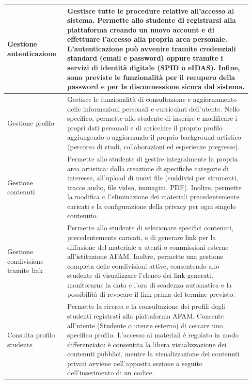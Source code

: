 \documentclass[12pt,a4paper]{article}
\begin{document}
\small
\begin{longtable}{|
>{\columncolor{unipablue}\color{white}\bfseries\raggedright\arraybackslash}p{4.1cm}|
>{\raggedright\arraybackslash}p{10.4cm}|}
\hline
Gestione autenticazione & Gestisce tutte le procedure relative all'accesso al sistema. Permette allo studente di registrarsi alla piattaforma creando un nuovo account e di effettuare l'accesso alla propria area personale. L'autenticazione può avvenire tramite credenziali standard (email e password) oppure tramite i servizi di identità digitale (SPID o eIDAS). Infine, sono previste le funzionalità per il recupero della password e per la disconnessione sicura dal sistema. \\ \hline
Gestione profilo & Gestisce le funzionalità di consultazione e aggiornamento delle informazioni personali e curriculari dell'utente. Nello specifico, permette allo studente di inserire e modificare i propri dati personali e di arricchire il proprio profilo aggiungendo o aggiornando il proprio background artistico (percorso di studi, collaborazioni ed esperienze pregresse). \\ \hline
Gestione contenuti & Permette allo studente di gestire integralmente la propria area artistica: dalla creazione di specifiche categorie di interesse, all'upload di nuovi file (suddivisi per strumenti, tracce audio, file video, immagini, PDF). Inoltre, permette la modifica o l'eliminazione dei materiali precedentemente caricati e la configurazione della privacy per ogni singolo contenuto. \\ \hline
Gestione condivisione tramite link & Permette allo studente di selezionare specifici contenuti, precedentemente caricati, e di generare link per la diffusione del materiale a utenti o commissioni esterne all'istituzione AFAM. Inoltre, permette una gestione completa delle condivisioni attive, consentendo allo studente di visualizzare l'elenco dei link generati, monitorarne la data e l'ora di scadenza automatica e la possibilità di revocare il link prima del termine previsto. \\ \hline
Consulta profilo studente & Permette la ricerca e la consultazione dei profili degli studenti registrati alla piattaforma AFAM. Consente all'utente (Studente o utente esterno) di cercare uno specifico profilo. L'accesso ai materiali è regolato in modo differenziato: è consentita la libera visualizzazione dei contenuti pubblici, mentre la visualizzazione dei contenuti privati avviene nell'apposita sezione a seguito dell'inserimento di un codice. \\ \hline

\end{longtable}
\end{document}
